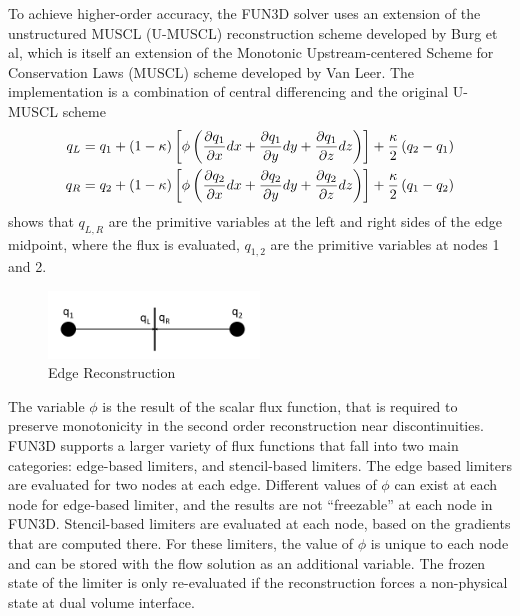 To achieve higher-order accuracy, the FUN3D solver uses an extension of the
unstructured MUSCL (U-MUSCL) reconstruction scheme developed by Burg et
al\cite{burg2005higher,burg2003verification}, which is itself an extension of
the Monotonic Upstream-centered Scheme for Conservation Laws (MUSCL) scheme
developed by Van Leer\cite{van1979towards}.  The implementation is a combination
of central differencing and the original U-MUSCL scheme
\begin{equation}
  \begin{aligned}
    q_L &= q_1 + (1-\kappa)\left[ \phi\left( \frac{\partial q_1}{\partial x}dx + \frac{\partial q_1}{\partial y}dy +
    \frac{\partial q_1}{\partial z}dz \right) \right] + \frac{\kappa}{2}\left( q_2 - q_1 \right) \\
    q_R &= q_2 + (1-\kappa)\left[ \phi\left( \frac{\partial q_2}{\partial x}dx + \frac{\partial q_2}{\partial y}dy +
    \frac{\partial q_2}{\partial z}dz \right) \right] + \frac{\kappa}{2}\left( q_1 - q_2 \right)
  \end{aligned}
  \label{u-muscl}
\end{equation}
 shows that $q_{L,R}$ are the primitive variables at the
left and right sides of the edge midpoint, where the flux is evaluated,
$q_{1,2}$ are the primitive variables at nodes 1 and 2.
\begin{figure}[h]
  \centering
  \includegraphics[width=0.5\textwidth]{figures/edge_reconstruction.png}
  \caption{Edge Reconstruction}
  \label{fig:edge-recons}
\end{figure}
The variable $\phi$ is the result of the scalar flux function, that is required
to preserve monotonicity in the second order reconstruction near
discontinuities.  FUN3D supports a larger variety of flux functions that fall
into two main categories: edge-based limiters, and stencil-based limiters.  The
edge based limiters are evaluated for two nodes at each edge.  Different values
of $\phi$ can exist at each node for edge-based limiter, and the results are not
``freezable'' at each node in FUN3D. Stencil-based limiters are evaluated at
each node, based on the gradients that are computed there.  For these limiters,
the value of $\phi$ is unique to each node and can be stored with the flow
solution as an additional variable.  The frozen state of the limiter is only
re-evaluated if the reconstruction forces a non-physical state at dual volume
interface.

